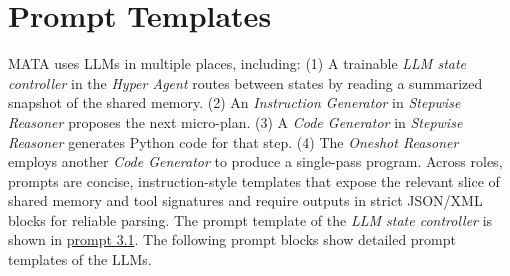 \documentclass{article} %
\newcommand{\methodname}{MATA}
\begin{document}

\section{Prompt Templates}
\label{sec:prompt_template}

\methodname{} uses LLMs in multiple places, including: (1) A trainable \emph{LLM state controller} in the \emph{Hyper Agent} routes between states by reading a summarized snapshot of the shared memory. (2) An \emph{Instruction Generator} in \emph{Stepwise Reasoner} proposes the next micro-plan. (3) A \emph{Code Generator} in \emph{Stepwise Reasoner} generates Python code for that step. (4) The \emph{Oneshot Reasoner} employs another \emph{Code Generator} to produce a single-pass program. Across roles, prompts are concise, instruction-style templates that expose the relevant slice of shared memory and tool signatures and require outputs in strict JSON/XML blocks for reliable parsing. The prompt template of the \emph{LLM state controller} is shown in \hyperref[prompt:hyper_agent]{prompt 3.1}. The following prompt blocks show detailed prompt templates of the LLMs.
\end{document}
